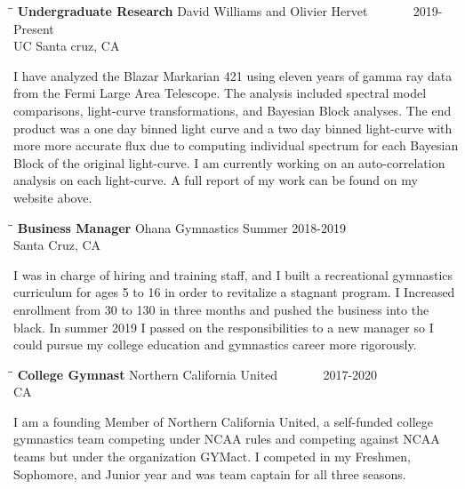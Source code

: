 \documentclass{res}
\begin{document}
\begin{resume}
\begin{tabbing}%
   \hspace{2.3in}\= \hspace{2.6in}\= \kill %
   {\bf Undergraduate Research}  \>David Williams and Olivier Hervet \> ~~~~~~ 2019-Present\\
                          \>UC Santa cruz, CA
   \end{tabbing}\vspace{-20pt}
   I have analyzed the Blazar Markarian 421 using eleven years of gamma ray data from the Fermi Large Area Telescope. The analysis included spectral model  comparisons, light-curve transformations, and Bayesian Block analyses. The end product was a one day binned light curve and a two day binned light-curve with more more accurate flux due to computing individual spectrum for each Bayesian Block of the original light-curve. I am currently working on an auto-correlation analysis on each light-curve. A full report of my work can be found on my website above. 
   
   \begin{tabbing}
   \hspace{2.3in}\= \hspace{2.6in}\= \kill %
    {\bf Business Manager} \>Ohana Gymnastics     \>Summer 2018-2019\\
                             \>Santa Cruz, CA
   \end{tabbing}\vspace{-20pt}      %
    I was in charge of hiring and training staff, and I built a recreational gymnastics curriculum for ages 5 to 16 in order to revitalize a stagnant program. I Increased enrollment from 30 to 130 in three months and pushed the business into the black. In summer 2019 I passed on the responsibilities to a new manager so I could pursue my college education and gymnastics career more rigorously. 
    
   \begin{tabbing}
   \hspace{2.3in}\= \hspace{2.6in}\= \kill %
    {\bf College Gymnast} \>Northern California United \> ~~~~~~ 2017-2020\\
                          \>CA
   \end{tabbing}\vspace{-20pt}
    I am a founding Member of Northern California United, a self-funded college gymnastics team competing under NCAA rules and competing against NCAA teams but under the organization GYMact. I competed in my Freshmen, Sophomore, and  Junior year and was team captain for all three seasons.
    

\end{resume}
\end{document}
